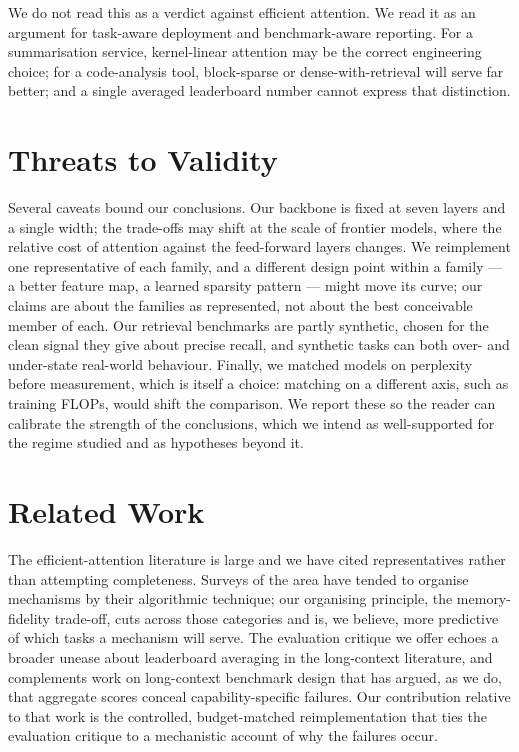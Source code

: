 \documentclass[11pt]{article}
\begin{document}
We do not read this as a verdict against efficient attention. We read it as an argument for task-aware deployment and benchmark-aware reporting. For a summarisation service, kernel-linear attention may be the correct engineering choice; for a code-analysis tool, block-sparse or dense-with-retrieval will serve far better; and a single averaged leaderboard number cannot express that distinction.

\section{Threats to Validity}
\label{sec:threats}

Several caveats bound our conclusions. Our backbone is fixed at seven layers and a single width; the trade-offs may shift at the scale of frontier models, where the relative cost of attention against the feed-forward layers changes. We reimplement one representative of each family, and a different design point within a family --- a better feature map, a learned sparsity pattern --- might move its curve; our claims are about the families as represented, not about the best conceivable member of each. Our retrieval benchmarks are partly synthetic, chosen for the clean signal they give about precise recall, and synthetic tasks can both over- and under-state real-world behaviour. Finally, we matched models on perplexity before measurement, which is itself a choice: matching on a different axis, such as training FLOPs, would shift the comparison. We report these so the reader can calibrate the strength of the conclusions, which we intend as well-supported for the regime studied and as hypotheses beyond it.

\section{Related Work}
\label{sec:related}

The efficient-attention literature is large and we have cited representatives rather than attempting completeness. Surveys of the area have tended to organise mechanisms by their algorithmic technique; our organising principle, the memory-fidelity trade-off, cuts across those categories and is, we believe, more predictive of which tasks a mechanism will serve. The evaluation critique we offer echoes a broader unease about leaderboard averaging in the long-context literature, and complements work on long-context benchmark design that has argued, as we do, that aggregate scores conceal capability-specific failures. Our contribution relative to that work is the controlled, budget-matched reimplementation that ties the evaluation critique to a mechanistic account of why the failures occur.
\end{document}
